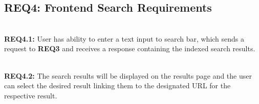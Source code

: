 \subsection{REQ4: Frontend Search Requirements}

\textbf{\\REQ4.1:} User has ability to enter a text input to search bar, which sends a request to \textbf{REQ3} and receives a response containing the indexed search results.\par

\textbf{\\REQ4.2:} The search results will be displayed on the results page and the user can select the desired result linking them to the designated URL for the respective result.\par

